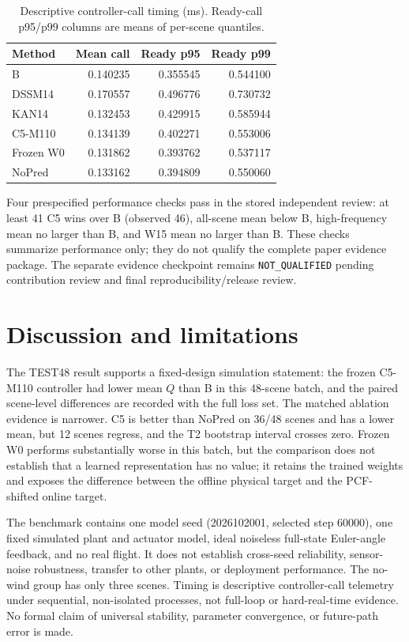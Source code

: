 \documentclass[11pt]{article}
\begin{document}
\begin{table}[t]
\centering
\small
\caption{Descriptive controller-call timing (ms). Ready-call p95/p99 columns are means of per-scene quantiles.}
\label{tab:timing}
\begin{tabular}{lrrr}
\toprule
Method & Mean call & Ready p95 & Ready p99 \\
\midrule
B & 0.140235 & 0.355545 & 0.544100 \\
DSSM14 & 0.170557 & 0.496776 & 0.730732 \\
KAN14 & 0.132453 & 0.429915 & 0.585944 \\
C5-M110 & 0.134139 & 0.402271 & 0.553006 \\
Frozen W0 & 0.131862 & 0.393762 & 0.537117 \\
NoPred & 0.133162 & 0.394809 & 0.550060 \\
\bottomrule
\end{tabular}
\end{table}

Four prespecified performance checks pass in the stored independent review: at least 41 C5 wins over B (observed 46), all-scene mean below B, high-frequency mean no larger than B, and W15 mean no larger than B. These checks summarize performance only; they do not qualify the complete paper evidence package. The separate evidence checkpoint remains \texttt{NOT\_QUALIFIED} pending contribution review and final reproducibility/release review.

\section{Discussion and limitations}\label{sec:limitations}
The TEST48 result supports a fixed-design simulation statement: the frozen C5-M110 controller had lower mean $Q$ than B in this 48-scene batch, and the paired scene-level differences are recorded with the full loss set. The matched ablation evidence is narrower. C5 is better than NoPred on 36/48 scenes and has a lower mean, but 12 scenes regress, and the T2 bootstrap interval crosses zero. Frozen W0 performs substantially worse in this batch, but the comparison does not establish that a learned representation has no value; it retains the trained weights and exposes the difference between the offline physical target and the PCF-shifted online target.

The benchmark contains one model seed (2026102001, selected step 60000), one fixed simulated plant and actuator model, ideal noiseless full-state Euler-angle feedback, and no real flight. It does not establish cross-seed reliability, sensor-noise robustness, transfer to other plants, or deployment performance. The no-wind group has only three scenes. Timing is descriptive controller-call telemetry under sequential, non-isolated processes, not full-loop or hard-real-time evidence. No formal claim of universal stability, parameter convergence, or future-path error is made.
\end{document}
